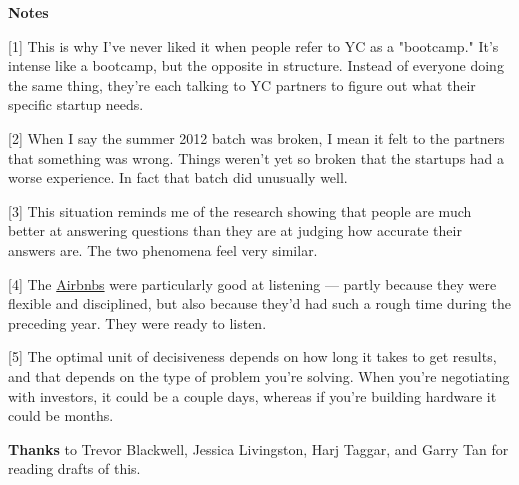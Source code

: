 \textbf{Notes}

[1] This is why I've never liked it when people refer to YC as
                  a "bootcamp." It's intense like a bootcamp, but the opposite
                  in structure. Instead of everyone doing the same thing,
                  they're each talking to YC partners to figure out what their
                  specific startup needs.

[2] When I say the summer 2012 batch was broken, I mean it felt
                  to the partners that something was wrong. Things weren't yet
                  so broken that the startups had a worse experience. In fact
                  that batch did unusually well.

[3] This situation reminds me of the research showing that
                  people are much better at answering questions than they are at
                  judging how accurate their answers are. The two phenomena feel
                  very similar.

[4] The \href{http://www.paulgraham.com/airbnbs.html}{Airbnbs} were particularly
                  good at listening --- partly because they were flexible
                  and disciplined, but also because they'd had such a rough time
                  during the preceding year. They were ready to listen.

[5] The optimal unit of decisiveness depends on how long it
                  takes to get results, and that depends on the type of problem
                  you're solving. When you're negotiating with investors, it
                  could be a couple days, whereas if you're building hardware it
                  could be months.




                  \textbf{Thanks} to Trevor Blackwell, Jessica Livingston, Harj
                    Taggar, and Garry Tan for reading drafts of this.


              
            
          
            
              
                


                  
              
            
          
